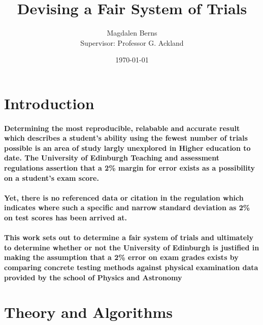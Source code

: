 \documentclass[12pt]{article}
\title{Devising a Fair System of Trials}
\author{Magdalen Berns \\
    Supervisor: Professor G. Ackland}
\date{\today}
\begin{document}
\maketitle
\thispagestyle{empty}

\begin{abstract}
\noindent
{}
\end{abstract}

\clearpage
\tableofcontents
\thispagestyle{empty}
\clearpage
\section{Introduction}

\paragraph{Determining the most reproducible, relabable and accurate result which describes a student's
ability using the fewest number of trials possible is an area of study largly unexplored in
Higher education to date. The University of Edinburgh Teaching and assessment regulations
assertion that a 2\% margin for error exists as a possibility on a student's exam score.\cite{}}


\paragraph{Yet, there is no referenced data or citation in the regulation which indicates where such
a specific and narrow standard deviation as 2\% on test scores has been arrived at.}


\paragraph{This work sets out to determine a fair system of trials and ultimately to determine
whether or not the University of Edinburgh is justified in making the assumption that
a 2\% error on exam grades exists by comparing concrete testing methods against physical
examination data provided by the school of Physics and Astronomy}

\section{Theory and Algorithms}
\end{document}
